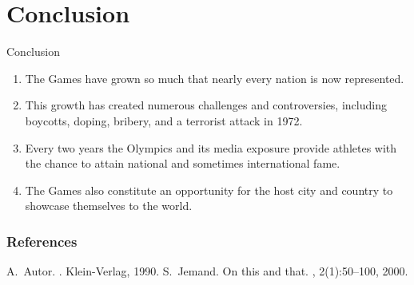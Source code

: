 \documentclass[xcolor=table]{beamer}
\begin{document}
\section{Conclusion}


\begin{frame}{Conclusion}
    \begin{enumerate}
        \item The Games have grown so much that nearly every nation is now represented. 
        \item This growth has created numerous challenges and controversies, including boycotts, doping, bribery, and a terrorist attack in 1972.
        \item  Every two years the Olympics and its media exposure provide athletes with the chance to attain national and sometimes international fame. 
        \item The Games also constitute an opportunity for the host city and country to showcase themselves to the world.
   \end{enumerate}
\end{frame}

\begin{frame}[allowframebreaks]
	\frametitle<presentation>{References}    
	\begin{thebibliography}{10}    
	\beamertemplatebookbibitems
	  A.~Autor.
	  .
	  \newblock Klein-Verlag, 1990.
	\beamertemplatearticlebibitems
	  S.~Jemand.
	  \newblock On this and that.
	  , 2(1):50--100, 2000.
	\end{thebibliography}
  \end{frame}
\end{document}
